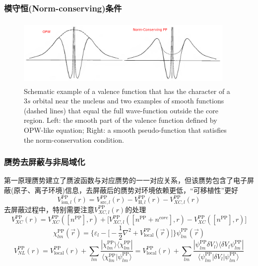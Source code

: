 \documentclass[cjk,slidestop,compress,mathserif,blue]{beamer}
\begin{document}
\frame
{
	\frametitle{模守恒\textrm{(Norm-conserving)}条件}
\begin{figure}[h!]
\centering
\vspace*{-0.10in}
\includegraphics[height=1.30in,width=4.17in,viewport=0 0 1150 350,clip]{Figures/Pseudo-OPW_NCPP.png}
\caption{\tiny \textrm{Schematic example of a valence function that has the character of a $3s$ orbital near the nucleus and two examples of smooth functions (dashed lines) that equal the full wave-function outside the core region. Left: the smooth part of the valence function defined by OPW-like equation; Right: a smooth pseudo-function that satisfies the norm-conservation condition.}}%
\label{Pseudo-OPW_NCPP}
\end{figure}
}

\frame
{
	\frametitle{赝势去屏蔽与非局域化}
	第一原理赝势建立了赝波函数与对应赝势的一一对应关系，但该赝势包含了电子屏蔽(原子、离子环境)信息，去屏蔽后的赝势对环境依赖更低，“可移植性”更好
	$$V_{\mathrm{ion},l}^{\mathrm{PP}}(r)=V_{\mathrm{src},l}^{\mathrm{PP}}(r)-V_{\mathrm{H},l}^{\mathrm{PP}}(r)-V_{XC,l}^{\mathrm{PP}}(r)$$
	去屏蔽过程中，特别需要注意$V_{XC,l}^{\mathrm{PP}}(r)$的处理
	$$V_{XC}^{\mathrm{PP}}(r)=V_{XC}^{\mathrm{PP}}([n^{\mathrm{PP}}],r)+\big[V_{XC,l}^{\mathrm{PP}}([n^{\mathrm{PP}}+n^{core}],r)-V_{XC}^{\mathrm{PP}}([n^{\mathrm{PP}}],r)\big]$$
	{\fontsize{7.2pt}{5.2pt}\selectfont{如果定义辅助函数}}
	$$\chi_{lm}^{\mathrm{PP}}(\vec r)=\bigg\{\varepsilon_l-\bigg[-\dfrac12\nabla^2+V_{\mathrm{local}}^{\mathrm{PP}}(\vec r)\bigg]\bigg\}\psi_{lm}^{\mathrm{PP}}(\vec r)$$
	{\fontsize{7.2pt}{5.2pt}}
	$$V_{NL}^{\mathrm{PP}}(r)=V_{\mathrm{local}}^{\mathrm{PP}}(r)+\sum_{lm}\dfrac{|\chi_{lm}^{\mathrm{PP}}\rangle\langle\chi_{lm}^{\mathrm{PP}}|}{\langle\chi_{lm}^{\mathrm{PP}}|\psi_{lm}^{\mathrm{PP}}\rangle}=V_{\mathrm{local}}^{\mathrm{PP}}(r)+\sum_{lm}\dfrac{|\psi_{lm}^{\mathrm{PP}}\delta V_l\rangle\langle\delta V_l\psi_{lm}^{\mathrm{PP}}|}{\langle\psi_{lm}^{\mathrm{PP}}|\delta V_l|\psi_{lm}^{\mathrm{PP}}\rangle}$$
}
\end{document}
